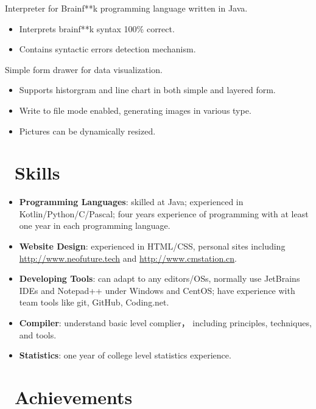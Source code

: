 \documentclass{resume}
\begin{document}
Interpreter for Brainf**k programming language written in Java.
\begin{itemize}
  \item Interprets brainf**k syntax 100\% correct.
  \item Contains syntactic errors detection mechanism.
\end{itemize}

Simple form drawer for data visualization.
\begin{itemize}
  \item Supports historgram and line chart in both simple and layered form.
  \item Write to file mode enabled, generating images in various type.
  \item Pictures can be dynamically resized.
\end{itemize}

\section{\faCogs\ Skills}
\begin{itemize}[parsep=0.5ex]
  \item \textbf{Programming Languages}:
    skilled at Java; experienced in Kotlin/Python/C/Pascal; four years experience of programming with at least one year in each programming language.
  \item \textbf{Website Design}:
    experienced in HTML/CSS, personal sites including {\url{http://www.neofuture.tech}} and {\url{http://www.cmstation.cn}}.
  \item \textbf{Developing Tools}:
    can adapt to any editors/OSs, normally use JetBrains IDEs and Notepad++ under Windows and CentOS; have experience with team tools like git, GitHub, Coding.net.
  \item \textbf{Compiler}:
    understand basic level complier， including principles, techniques, and tools. 
  \item \textbf{Statistics}:
    one year of college level statistics experience.
\end{itemize}

\section{\faHeartO\ Achievements}
\end{document}
